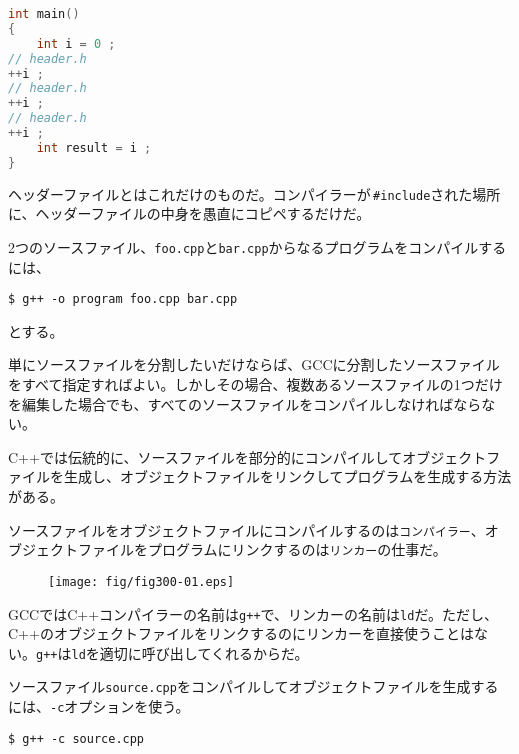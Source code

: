 \begin{lstlisting}[language={C++}]
int main()
{
    int i = 0 ;
// header.h
++i ;
// header.h
++i ;
// header.h
++i ;
    int result = i ;
}
\end{lstlisting}

ヘッダーファイルとはこれだけのものだ。コンパイラーが\,\texttt{\#include}された場所に、ヘッダーファイルの中身を愚直にコピペするだけだ。


2つのソースファイル、\texttt{foo.cpp}と\texttt{bar.cpp}からなるプログラムをコンパイルするには、
\begin{lstlisting}[style=terminal]
$ g++ -o program foo.cpp bar.cpp
\end{lstlisting}
とする。


単にソースファイルを分割したいだけならば、GCCに分割したソースファイルをすべて指定すればよい。しかしその場合、複数あるソースファイルの1つだけを編集した場合でも、すべてのソースファイルをコンパイルしなければならない。

C++では伝統的に、ソースファイルを部分的にコンパイルしてオブジェクトファイルを生成し、オブジェクトファイルをリンクしてプログラムを生成する方法がある。

ソースファイルをオブジェクトファイルにコンパイルするのは\texttt{コンパイラー}、オブジェクトファイルをプログラムにリンクするのは\texttt{リンカー}の仕事だ。

\begin{figure}[htbp]
  \centering
  \texttt{[image: fig/fig300-01.eps]}
  \label{fig:300-01}
\end{figure}

GCCではC++コンパイラーの名前は\texttt{g++}で、リンカーの名前は\texttt{ld}だ。ただし、C++のオブジェクトファイルをリンクするのにリンカーを直接使うことはない。\texttt{g++}は\texttt{ld}を適切に呼び出してくれるからだ。

ソースファイル\texttt{source.cpp}をコンパイルしてオブジェクトファイルを生成するには、\texttt{-c}オプションを使う。

\begin{lstlisting}[style=terminal]
$ g++ -c source.cpp
\end{lstlisting}

